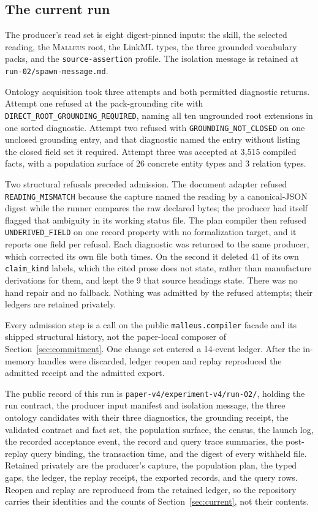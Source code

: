 \documentclass[10pt]{article}
\newcommand{\malleus}{\textsc{Malleus}}
\newcommand{\code}[1]{\texttt{#1}}
\begin{document}
\subsection{The current run}
\label{app:b3}

The producer's read set is eight digest-pinned inputs: the skill, the selected reading, the \malleus{} root, the LinkML types, the three grounded vocabulary packs, and the \code{source-assertion} profile. The isolation message is retained at \code{run-02/spawn-message.md}.

Ontology acquisition took three attempts and both permitted diagnostic returns. Attempt one refused at the pack-grounding rite with \code{DIRECT\_ROOT\_GROUNDING\_REQUIRED}, naming all ten ungrounded root extensions in one sorted diagnostic. Attempt two refused with \code{GROUNDING\_NOT\_CLOSED} on one unclosed grounding entry, and that diagnostic named the entry without listing the closed field set it required. Attempt three was accepted at 3,515 compiled facts, with a population surface of 26 concrete entity types and 3 relation types.

Two structural refusals preceded admission. The document adapter refused \code{READING\_MISMATCH} because the capture named the reading by a canonical-JSON digest while the runner compares the raw declared bytes; the producer had itself flagged that ambiguity in its working status file. The plan compiler then refused \code{UNDERIVED\_FIELD} on one record property with no formalization target, and it reports one field per refusal. Each diagnostic was returned to the same producer, which corrected its own file both times. On the second it deleted 41 of its own \code{claim\_kind} labels, which the cited prose does not state, rather than manufacture derivations for them, and kept the 9 that source headings state. There was no hand repair and no fallback. Nothing was admitted by the refused attempts; their ledgers are retained privately.

Every admission step is a call on the public \code{malleus.compiler} facade and its shipped structural history, not the paper-local composer of Section~\ref{sec:commitment}. One change set entered a 14-event ledger. After the in-memory handles were discarded, ledger reopen and replay reproduced the admitted receipt and the admitted export.

The public record of this run is \code{paper-v4/experiment-v4/run-02/}, holding the run contract, the producer input manifest and isolation message, the three ontology candidates with their three diagnostics, the grounding receipt, the validated contract and fact set, the population surface, the census, the launch log, the recorded acceptance event, the record and query trace summaries, the post-replay query binding, the transaction time, and the digest of every withheld file. Retained privately are the producer's capture, the population plan, the typed gaps, the ledger, the replay receipt, the exported records, and the query rows. Reopen and replay are reproduced from the retained ledger, so the repository carries their identities and the counts of Section~\ref{sec:current}, not their contents.
\end{document}
